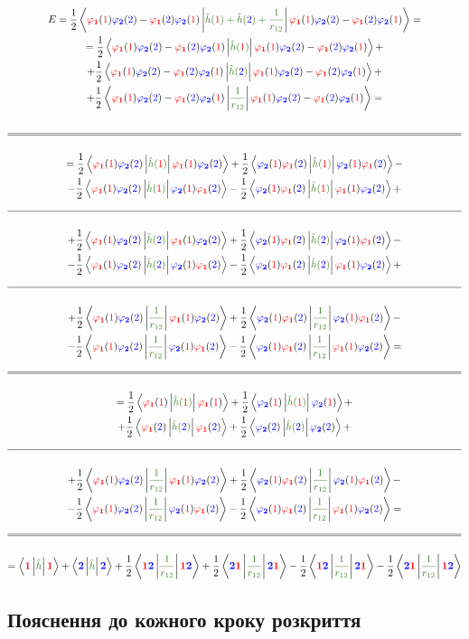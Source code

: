 \documentclass[]{article}
\def\opbracket#1#2#3{\left\langle #1\left| \textcolor{OliveGreen}{#2}\right|  #3 \right\rangle}
\let\vphi\varphi
\def\f{(\textcolor{red}{1})}
\def\s{(\textcolor{blue}{2})}
\def\F{\textcolor{red}{\mathbf{1}}}
\def\S{\textcolor{blue}{\mathbf{2}}}
\def\oa{\textcolor{red}{ \vphi_{\mathbf{1}}} }
\def\ob{\textcolor{blue}{ \vphi_{\mathbf{2}}} }
\def\cPhi{\oa\f \ob\s - \oa\s \ob\f} %
\def\h{\hat{h}}
\def\ha{\h\f}
\def\hb{\h\s}
\def\V{\frac{1}{r_{12}}}
\def\a{\oa\f \ob\s}
\def\b{\ob\f \oa\s}
\def\hr{\hrulefill\\*[10pt]}
\def\hhr{\hrulefill\\[-0.9\baselineskip]\hrulefill\\*[10pt]}
\begin{document}
\hrulefill
\begin{multline*}
    E = \frac12 \opbracket{\cPhi}{\ha + \hb + \V}{\cPhi} = \\
    = \frac12\opbracket{\cPhi}{\ha}{\cPhi} + \\
    + \frac12\opbracket{\cPhi}{\hb}{\cPhi} + \\
    + \frac12\opbracket{\cPhi}{\V}{\cPhi} = \\[10pt]
    \hhr
    = \frac12\opbracket{\a}{\ha}{\a} + \frac12\opbracket{\b}{\ha}{\b} - \\
    - \frac12\opbracket{\a}{\ha}{\b} - \frac12\opbracket{\b}{\ha}{\a} + \\
    \hr
    + \frac12\opbracket{\a}{\hb}{\a} + \frac12\opbracket{\b}{\hb}{\b} - \\
    - \frac12\opbracket{\a}{\hb}{\b} - \frac12\opbracket{\b}{\hb}{\a} + \\
    \hr
    + \frac12\opbracket{\a}{\V}{\a} + \frac12\opbracket{\b}{\V}{\b} - \\
    - \frac12\opbracket{\a}{\V}{\b} - \frac12\opbracket{\b}{\V}{\a} = \\
    \hhr
    = \frac12\opbracket{\oa\f}{\ha}{\oa\f} + \frac12\opbracket{\ob\f}{\ha}{\ob\f} + \\
    + \frac12\opbracket{\oa\s}{\hb}{\oa\s} + \frac12\opbracket{\ob\s}{\hb}{\ob\s} + \\
    \hr
    + \frac12\opbracket{\a}{\V}{\a} + \frac12\opbracket{\b}{\V}{\b} - \\
    - \frac12\opbracket{\a}{\V}{\b} - \frac12\opbracket{\b}{\V}{\a} =  \\
    \hhr
    = \opbracket{\F}{\h}{\F} + \opbracket{\S}{\h}{\S}
    + \frac12\opbracket{\F\S}{\V}{\F\S} + \frac12\opbracket{\S\F}{\V}{\S\F} -
    \frac12\opbracket{\F\S}{\V}{\S\F} - \frac12\opbracket{\S\F}{\V}{\F\S}
\end{multline*}

\subsection*{Пояснення до кожного кроку розкриття}
\end{document}
